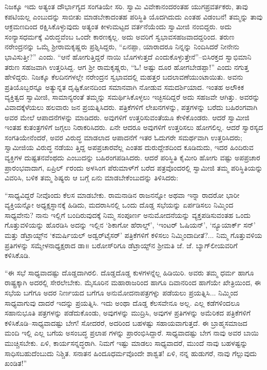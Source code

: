 ನಿಜಕ್ಕೂ ಇದು ಅತ್ಯಂತ ದೌರ್ಭಾಗ್ಯದ ಸಂಗತಿಯೇ ಸರಿ. ಸ್ವಾಮಿ ವಿವೇಕಾನಂದರಂತಹ ಯುಗಪ್ರವರ್ತಕರು, ತಾವು ಕಪಟಿಯಲ್ಲ ಎಂಬುದನ್ನು ಸಾಬೀತು ಮಾಡಬೇಕಾದಂತಹ ಪರಿಸ್ಥಿತಿ ಯೊದಗಿದುದು ಎಂತಹ ವಿಡಂಬನೆ! ತಮ್ಮನ್ನು ತಾವು ಆಕ್ರಮಣದಿಂದ ರಕ್ಷಿಸಿಕೊಳ್ಳುವುದು ಅತ್ಯಂತ ಕೀಳುಮಟ್ಟದ ವರ್ತನೆಯೆಂದು ಸ್ವಾಮೀಜಿ ನಂಬಿದ್ದರು. ಅದು ಸಂನ್ಯಾಸಧರ್ಮಕ್ಕೆ ವಿರುದ್ಧವೆಂಬ ಒಂದೇ ಕಾರಣಕ್ಕಲ್ಲ. ಅದು ಅವರಿಗೆ ಸ್ವಭಾವಸಹಜವಾದದ್ದರಿಂದ. ತರುಣ ನರೇಂದ್ರನನ್ನು ಒಮ್ಮೆ ಶ್ರೀರಾಮಕೃಷ್ಣರು ಪ್ರಶ್ನಿಸಿದ್ದರು, “ಏನಪ್ಪಾ, ಯಾರಾದರೂ ನಿನ್ನನ್ನು ನಿಂದಿಸಿದರೆ ನೀನೇನು ಭಾವಿಸುತ್ತೀ?” ಎಂದು. “ಆನೆ ಹೋಗುತ್ತಿದ್ದರೆ ನಾಯಿ ಬೊಗಳುತ್ತದೆ ಎಂದುಕೊಳ್ಳುತ್ತೇನೆ”–ಬಿಸಿರಕ್ತದ ಸ್ವಾಭಿಮಾನಿ ತರುಣ ಸಹಜವಾಗಿ ಉತ್ತರಿಸಿದ್ದ. ಆಗ ಶ್ರೀ ರಾಮಕೃಷ್ಣರು, “ಓ! ಅಷ್ಟು ದೂರ ಹೋಗಬೇಡಪ್ಪಾ!” ಎಂದು ನಗುತ್ತ ಹೇಳಿದ್ದರು. ನಿಜಕ್ಕೂ ಕೆಲದಿನಗಳಲ್ಲೇ ನರೇಂದ್ರನ ಸ್ವಭಾವದಲ್ಲಿ ಮಹತ್ತರ ಬದಲಾವಣೆಯುಂಟಾಯಿತು. ಅವನು ಪ್ರತಿಯೊಬ್ಬರನ್ನೂ ಅತ್ಯುನ್ನತ ದೃಷ್ಟಿಕೋನದಿಂದ ಸಮಾನವಾಗಿ ನೋಡುವ ಸಮದರ್ಶಿಯಾದ. ಇಂತಹ ಅಲೌಕಿಕ ವ್ಯಕ್ತಿತ್ವದ ಸ್ವಾಮೀಜಿ, ಸಾಮಾನ್ಯರಂತೆ ತಮ್ಮನ್ನು ಸಮರ್ಥಿಸಿಕೊಳ್ಳಲು ಇಚ್ಛಿಸದಿದ್ದರೆ ಅದು ಸಹಜವೇ ಆಗಿತ್ತು. ಅವರನ್ನು ವಿವಾದಕ್ಕೆಳೆಯಲು ಹಲವಾರು ಜನ ಪ್ರಯತ್ನಿಸಿದರು. ಪತ್ರಿಕೆಗಳಿಗೆ ಲೇಖನಗಳನ್ನು, ಪತ್ರಗಳನ್ನು ಬರೆದು ಬಹಿರಂಗವಾಗಿ ಅವರ ಮೇಲೆ ಆಪಾದನೆಗಳನ್ನು ಮಾಡಿದರು. ಅವುಗಳಿಗೆ ಉತ್ತರಿಸುವಂತೆಯೂ ಕೇಳಿಕೊಂಡರು. ಆದರೆ ಸ್ವಾಮೀಜಿ ಇಂತಹ ಕುತಂತ್ರಗಳಿಗೆ ಜಗ್ಗಲು ನಿರಾಕರಿಸಿದರು. ಏನೇ ಆದರೂ ಅವುಗಳಿಗೆ ಉತ್ತರಿಸಲು ಹೋಗಲಿಲ್ಲ. ಆದರೆ ಸ್ವಾರಸ್ಯದ ಸಂಗತಿಯೇನೆಂದರೆ, ಅವರ ವಿರುದ್ಧ ಮಾಡಲಾದ ಆಪಾದನೆಗೆ ಇತರ ಓದುಗರೇ ಸಮರ್ಥವಾಗಿ ಉತ್ತರಿಸಿದರು; ಸ್ವಾಮೀಜಿಯ ವಿರುದ್ಧ ನಡೆಯು ತ್ತಿದ್ದ ಅಪಪ್ರಚಾರವೆಲ್ಲ ಎಂತಹ ದುರುದ್ದೇಶದಿಂದ ಕೂಡಿದುದು, ಇದರ ಹಿಂದಿರುವ ವ್ಯಕ್ತಿಗಳ ದುಷ್ಟತನವೆಂಥದು ಎಂಬುದನ್ನು ಬಹಿರಂಗಪಡಿಸಿದರು. ಆದರೆ ಪರಿಸ್ಥಿತಿ ಕೈಮೀರಿ ಹೋಗು ವಷ್ಟು ಅಪಪ್ರಚಾರ ಪ್ರಾರಂಭವಾದಾಗ, ಏಪ್ರಿಲ್ ೯ರಂದು ಅಳಸಿಂಗ ಪೆರುಮಾಳ್​ಗೆ ಬರೆದ ಪತ್ರವೊಂದರಲ್ಲಿ ಸ್ವಾಮೀಜಿ ತಮ್ಮ ಪರಿಸ್ಥಿತಿಯನ್ನು ವಿವರಿಸಿ, ಬಳಿಕ ತಮ್ಮ ಶಿಷ್ಯರು ಆ ಬಗ್ಗೆ ಏನು ಮಾಡಬೇಕೆಂಬುದನ್ನು ತಿಳಿಸಿದರು:

“ಸಾಧ್ಯವಿದ್ದರೆ ನೀವೊಂದು ಕೆಲಸ ಮಾಡಬೇಕು. ರಾಮನಾಡಿನ ರಾಜನನ್ನೋ ಅಥವಾ ಇನ್ನಾ ರಾದರೋ ಭಾರೀ ವ್ಯಕ್ತಿಯನ್ನೋ ಅಧ್ಯಕ್ಷಸ್ಥಾನಕ್ಕೆ ಹಿಡಿದು, ಮದರಾಸಿನಲ್ಲಿ ಒಂದು ದೊಡ್ಡ ಸಭೆಯನ್ನು ಏರ್ಪಡಿಸಲು ನಿಮ್ಮಿಂದ ಸಾಧ್ಯವೇನು? ನಾನು ಇಲ್ಲಿಗೆ ಬಂದಿರುವುದಕ್ಕೆ ನಿಮ್ಮ ಸಂಪೂರ್ಣ ಅನುಮೋದನೆಯನ್ನು ವ್ಯಕ್ತಪಡಿಸುವಂತಹ ಒಂದು ಗೊತ್ತುವಳಿಯನ್ನು ಹೊರಡಿಸಿ ಅದನ್ನು ಇಲ್ಲಿನ ‘ಶಿಕಾಗೋ ಹೆರಾಲ್ಡ್​’, ‘ಇಂಟರ್ ಓಷಿಯನ್​’, ‘ನ್ಯೂಯಾರ್ಕ್ ಸನ್​’ ಮತ್ತು ಡೆಟ್ರಾಯ್ಟ್​ನ ‘ಕಮರ್ಷಿಯಲ್ ಅಡ್ವರ್​ಟೈಸರ್​’ ಪತ್ರಿಕೆಗಳಿಗೆ ಕಳಿಸಲು ನಿಮ್ಮಿಂದಾದೀತೆ?... ನಿಮ್ಮ ಗೊತ್ತುವಳಿಯ ಪ್ರತಿಗಳನ್ನು ಸಮ್ಮೇಳನಾಧ್ಯಕ್ಷರಾದ ಡಾ॥ ಬರೋಸ್​ರಿಗೂ ಡೆಟ್ರಾಯ್ಟ್​ನ ಶ್ರೀಮತಿ ಜೆ. ಜೆ. ಬ್ಯಾಗ್​ಲೀಯವರಿಗೆ ಕಳಿಸಿಕೊಡಿ.

“ಈ ಸಭೆ ಸಾಧ್ಯವಾದಷ್ಟು ದೊಡ್ಡದಾಗಿರಲಿ. ದೊಡ್ಡದೊಡ್ಡ ಕುಳಗಳನ್ನೆಲ್ಲ ಹಿಡಿಯಿರಿ. ಅವರು ತಮ್ಮ ಧರ್ಮ ಹಾಗೂ ರಾಷ್ಟ್ರಕ್ಕಾಗಿ ಅದರಲ್ಲಿ ಸೇರಲೇಬೇಕು. ಮೈಸೂರಿನ ಮಹಾರಾಜರಿಂದ ಹಾಗೂ ದಿವಾನರಿಂದ ಹಾಗೆಯೇ ಖೇತ್ರಿಯಿಂದ, ಈ ಸಭೆಯ ಬಗೆಗೂ ಅದರ ನಿರ್ಣಯದ ಬಗೆಗೂ ಅನುಮೋದನಾಪತ್ರಗಳ್ನು ಪಡೆಯಲು ಪ್ರಯತ್ನಿಸಿ... ನಿಮ್ಮಿಂದ ಸಾಧ್ಯವಾಗುವು ದಾದರೆ ಇದನ್ನು ಪ್ರಯತ್ನಿಸಿ. ಇದು ಅಂಥಾ ದೊಡ್ಡ ಕೆಲಸವೇನೂ ಅಲ್ಲ. ಎಲ್ಲ ಕಡೆಗಳಿಂದಲೂ ಸಹಾನುಭೂತಿ ಪತ್ರಗಳನ್ನು ಪಡೆದುಕೊಂಡು, ಅವುಗಳನ್ನು ಮುದ್ರಿಸಿ, ಅವುಗಳ ಪ್ರತಿಗಳನ್ನು ಅಮೆರಿಕದ ಪತ್ರಿಕೆಗಳಿಗೆ ಕಳಿಸಿಕೊಡಿ–ಸಾಧ್ಯವಾದಷ್ಟು ಬೇಗ! ಸೋದರರೆ, ಅದರಿಂದ ಬಹಳಷ್ಟು ಸಹಾಯವಾಗುತ್ತದೆ. ಈ ಬ್ರಾಹ್ಮಸಮಾಜದ ಮಂದಿ ಇಲ್ಲಿ ಎಲ್ಲ ಬಗೆಯ ಅಸಂಬದ್ಧ ಪ್ರಲಾಪ ಗಳನ್ನು ಪ್ರಾರಂಭಿಸಿದ್ದಾರೆ. ಸಾಧ್ಯವಾದಷ್ಟು ಬೇಗ ನಾವು ಅವರ ಬಾಯಿ ಮುಚ್ಚಿಸಬೇಕು. ಏಳಿ, ಕಾರ್ಯಸನ್ನದ್ಧರಾಗಿ. ನಿಮಗೆ ಇಷ್ಟು ಮಾಡಲು ಸಾಧ್ಯವಾದರೆ, ಮುಂದೆ ನಾವು ಬಹಳಷ್ಟನ್ನು ಸಾಧಿಸಬಹುದೆಂಬುದು ನಿಶ್ಚಿತ. ಸನಾತನ ಹಿಂದೂಧರ್ಮವೊಂದೇ ಶಾಶ್ವತ! ಏಳಿ, ನನ್ನ ಹುಡುಗರೆ, ನಾವು ಗೆಲ್ಲುವುದು ಖಂಡಿತ!”

